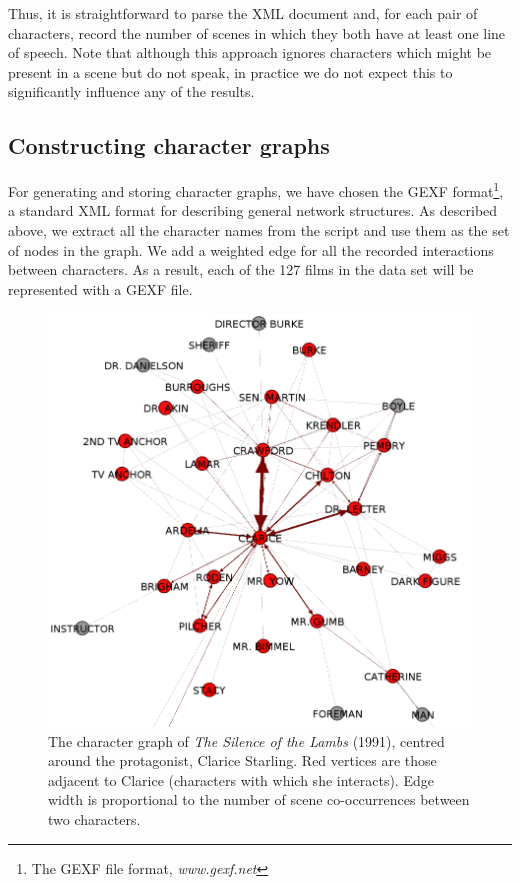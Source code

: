 \documentclass[bsc,frontabs,singlespacing,parskip, twoside]{infthesis}
\begin{document}
Thus, it is straightforward to parse the XML document and, for each pair of characters, record the number of scenes in which they both have at least one line of speech. Note that although this approach ignores characters which might be present in a scene but do not speak, in practice we do not expect this to significantly influence any of the results.

\subsection{Constructing character graphs}
For generating and storing character graphs, we have chosen the GEXF format\footnote{The GEXF file format, \textit{www.gexf.net}}, a standard XML format for describing general network structures. As described above, we extract all the character names from the script and use them as the set of nodes in the graph. We add a weighted edge for all the recorded interactions between characters. As a result, each of the 127 films in the data set will be represented with a GEXF file.

\begin{figure}
	\centering
	\includegraphics[scale=0.4]{figures/clarice_graph}
	\caption{The character graph of \textit{The Silence of the Lambs} (1991), centred around the protagonist, Clarice Starling. Red vertices are those adjacent to Clarice (characters with which she interacts). Edge width is proportional to the number of scene co-occurrences between two characters.}
\end{figure}
\end{document}
